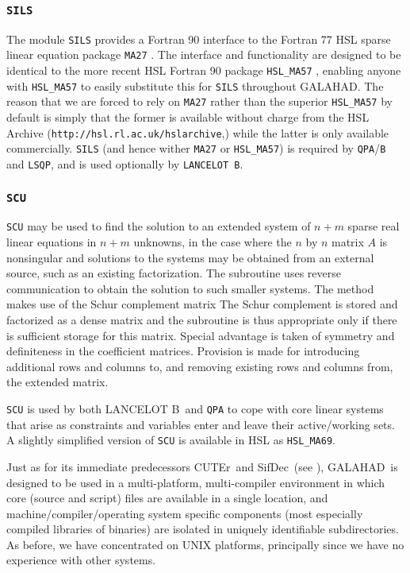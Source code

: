 \documentclass[twoside]{article}
\newcommand{\gal}{{\sf GALAHAD}}
\newcommand{\lanb}{{\sf LANCELOT B}}
\newcommand{\cuter}{{\sf CUTEr}}
\newcommand{\sifdec}{{\sf SifDec}}
\newcommand{\ltsubsubsection}[1]{\subsubsection{{\tt #1}} \label{#1}}
\begin{document}
\ltsubsubsection{SILS}

The module {\tt SILS} provides a Fortran 90 interface to the Fortran 77 HSL
sparse linear equation package {\tt MA27} \cite{DuffReid82}. 
The interface and functionality are 
designed to be identical to the more recent HSL Fortran 90 
package {\tt HSL\_MA57} \cite{Duff01}, enabling anyone with {\tt HSL\_MA57}
to easily substitute this for {\tt SILS} throughout \gal. The reason
that we are forced to rely on {\tt MA27} rather than the superior 
{\tt HSL\_MA57} by default is simply that
the former is available without charge from the HSL Archive
({\tt http://hsl.rl.ac.uk/hslarchive},) while the latter is only available
commercially.
{\tt SILS} (and hence wither {\tt MA27} or {\tt HSL\_MA57}) 
is required by {\tt QPA}/{\tt B} and {\tt LSQP}, and is
used optionally by {\tt LANCELOT B}.

\ltsubsubsection{SCU}

{\tt SCU} may be used to find the solution
to an extended system of $n + m$ 
sparse real linear equations in $n  +  m$ unknowns,
in the case where the $n$ by $n$ matrix $A$ is nonsingular 
and solutions to the systems 
may be obtained from an external source, such as an existing 
factorization.  The subroutine uses reverse communication to obtain 
the solution to such smaller systems.  The method makes use of 
the Schur complement matrix 
The Schur complement is stored and factorized as a dense matrix 
and the subroutine is thus appropriate only if there is 
sufficient storage for this matrix. Special advantage is taken 
of symmetry and definiteness in the coefficient matrices. 
Provision is made for introducing additional rows and columns 
to, and removing existing rows and columns from, the extended matrix. 

{\tt SCU} is used by both \lanb\ and {\tt QPA} to cope
with core linear systems that arise as constraints and variables
enter and leave their active/working sets. A slightly simplified
version of {\tt SCU} is available in HSL as {\tt HSL\_MA69}.


Just as for its immediate predecessors \cuter\ and \sifdec\
(see ),
\gal\ is designed to be used in a multi-platform, multi-compiler 
environment in which core (source and script) files are available
in a single location, and machine/compiler/operating system specific
components (most especially compiled libraries of binaries) are isolated in
uniquely identifiable subdirectories. As before, we have concentrated on 
UNIX platforms, principally since we have no experience with other systems.
\end{document}
